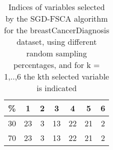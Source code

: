 \begin{table}
	\begin{center}
		\begin{tabular}{c c c c c c c}
			\% & 1 & 2 & 3 & 4 & 5 & 6 \\
			\hline
			30 & 23 & 3 & 13 & 22 & 21 & 2 \\
			70 & 23 & 3 & 13 & 22 & 21 & 2 \\
		\end{tabular}
	\end{center}
	\caption{Indices of variables selected by the SGD-FSCA algorithm for the breastCancerDiagnosis dataset, using different random sampling percentages, and for k = 1,..,6 the kth selected variable is indicated}
\end{table}